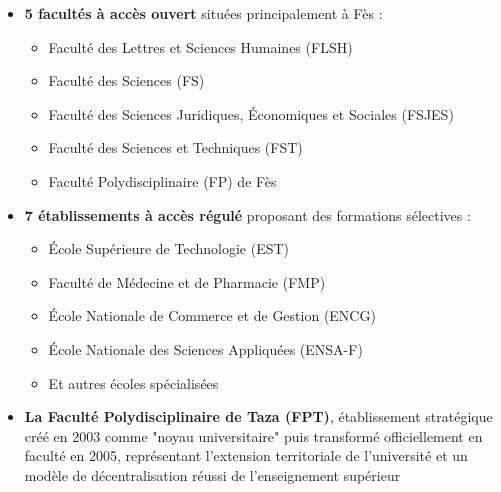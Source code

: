 \documentclass[french,12pt]{report} %
\begin{document}
\begin{itemize}
    \item \textbf{5 facultés à accès ouvert} situées principalement à Fès :
    \begin{itemize}\itemsep0em
        \item Faculté des Lettres et Sciences Humaines (FLSH)
        \item Faculté des Sciences (FS)
        \item Faculté des Sciences Juridiques, Économiques et Sociales (FSJES)
        \item Faculté des Sciences et Techniques (FST)
        \item Faculté Polydisciplinaire (FP) de Fès
    \end{itemize}
    
    \item \textbf{7 établissements à accès régulé} proposant des formations sélectives :
    \begin{itemize}\itemsep0em
        \item École Supérieure de Technologie (EST)
        \item Faculté de Médecine et de Pharmacie (FMP)
        \item École Nationale de Commerce et de Gestion (ENCG)
        \item École Nationale des Sciences Appliquées (ENSA-F)
        \item Et autres écoles spécialisées
    \end{itemize}
    
    \item \textbf{La Faculté Polydisciplinaire de Taza (FPT)}, établissement stratégique créé en 2003 comme "noyau universitaire" puis transformé officiellement en faculté en 2005, représentant l'extension territoriale de l'université et un modèle de décentralisation réussi de l'enseignement supérieur
\end{itemize}
\end{document}
